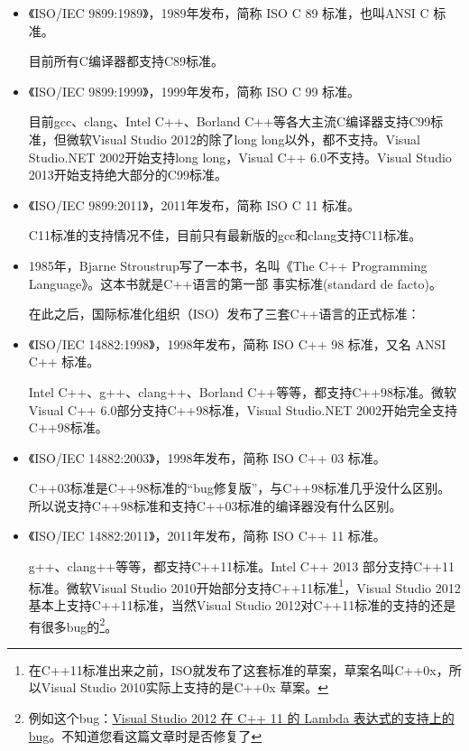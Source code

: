 \documentclass[11pt,twoside,a4paper,titlepage]{article}	%
\newcommand{\kw}[1]{\textcolor[rgb]{0.0,0.0,0.63}{ #1}}
\begin{document}
\begin{itemize}
\item 《ISO/IEC 9899:1989》，1989年发布，简称 ISO C 89 标准，也叫ANSI C 标准。

目前所有C编译器都支持C89标准。
\item 《ISO/IEC 9899:1999》，1999年发布，简称 ISO C 99 标准。

目前gcc、clang、Intel C++、Borland C++等各大主流C编译器支持C99标准，但微软Visual Studio 2012的除了long long以外，都不支持。Visual Studio.NET 2002开始支持long long，Visual C++ 6.0不支持。Visual Studio 2013开始支持绝大部分的C99标准。
\item 《ISO/IEC 9899:2011》，2011年发布，简称 ISO C 11 标准。

C11标准的支持情况不佳，目前只有最新版的gcc和clang支持C11标准。

\item 1985年，Bjarne Stroustrup写了一本书，名叫《The C++ Programming Language》。这本书就是C++语言的第一部\kw{事实标准(standard de facto)}。

在此之后，国际标准化组织（ISO）发布了三套C++语言的正式标准：
\item 《ISO/IEC 14882:1998》，1998年发布，简称 ISO C++ 98 标准，又名 ANSI C++ 标准。

Intel C++、g++、clang++、Borland C++等等，都支持C++98标准。微软Visual C++ 6.0部分支持C++98标准，Visual Studio.NET 2002开始完全支持C++98标准。

\item 《ISO/IEC 14882:2003》，1998年发布，简称 ISO C++ 03 标准。

C++03标准是C++98标准的“bug修复版”，与C++98标准几乎没什么区别。所以说支持C++98标准和支持C++03标准的编译器没有什么区别。

\item 《ISO/IEC 14882:2011》，2011年发布，简称 ISO C++ 11 标准。

g++、clang++等等，都支持C++11标准。Intel C++ 2013 部分支持C++11标准。微软Visual Studio 2010开始部分支持C++11标准\footnote{在C++11标准出来之前，ISO就发布了这套标准的草案，草案名叫C++0x，所以Visual Studio 2010实际上支持的是C++0x 草案。}，Visual Studio 2012基本上支持C++11标准，当然Visual Studio 2012对C++11标准的支持的还是有很多bug的\footnote{例如这个bug：\href{http://connect.microsoft.com/VisualStudio/feedback/details/804635/bug-in-lambda-expression-in-visual-studio-2012-update-3}{Visual Studio 2012 在 C++ 11 的 Lambda 表达式的支持上的bug}。不知道您看这篇文章时是否修复了}。
\end{itemize}
\end{document}
